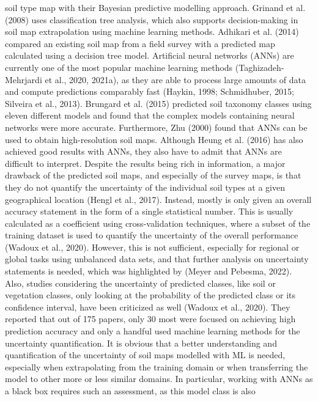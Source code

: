soil type map with their Bayesian predictive modelling approach.
Grinand et al. (2008) uses classification tree analysis, which also supports
decision-making in soil map extrapolation using machine learning
methods. Adhikari et al. (2014) compared an existing soil map from a
field survey with a predicted map calculated using a decision tree model.
Artificial neural networks (ANNs) are currently one of the most popular
machine learning methods (Taghizadeh-Mehrjardi et al., 2020, 2021a),
as they are able to process large amounts of data and compute predictions
comparably fast (Haykin, 1998; Schmidhuber, 2015; Silveira
et al., 2013). Brungard et al. (2015) predicted soil taxonomy classes
using eleven different models and found that the complex models containing
neural networks were more accurate. Furthermore, Zhu (2000)
found that ANNs can be used to obtain high-resolution soil maps.
Although Heung et al. (2016) has also achieved good results with ANNs,
they also have to admit that ANNs are difficult to interpret. Despite the
results being rich in information, a major drawback of the predicted soil
maps, and especially of the survey maps, is that they do not quantify the
uncertainty of the individual soil types at a given geographical location
(Hengl et al., 2017). Instead, mostly is only given an overall accuracy
statement in the form of a single statistical number. This is usually
calculated as a coefficient using cross-validation techniques, where a
subset of the training dataset is used to quantify the uncertainty of the
overall performance (Wadoux et al., 2020). However, this is not sufficient,
especially for regional or global tasks using unbalanced data sets,
and that further analysis on uncertainty statements is needed, which was
highlighted by (Meyer and Pebesma, 2022). Also, studies considering
the uncertainty of predicted classes, like soil or vegetation classes, only
looking at the probability of the predicted class or its confidence interval,
have been criticized as well (Wadoux et al., 2020). They reported
that out of 175 papers, only 30 %
most were focused on achieving high prediction accuracy and only a
handful used machine learning methods for the uncertainty quantification.
It is obvious that a better understanding and quantification of the
uncertainty of soil maps modelled with ML is needed, especially when
extrapolating from the training domain or when transferring the model
to other more or less similar domains. In particular, working with ANNs
as a black box requires such an assessment, as this model class is also
